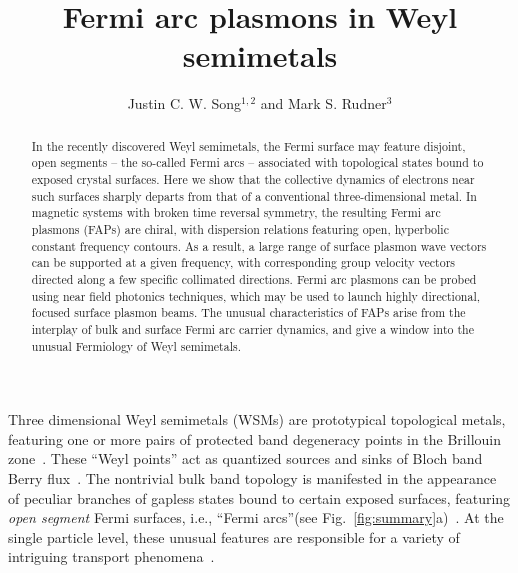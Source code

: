 \documentclass[aps,twocolumn,prl,groupedaddress]{revtex4}
\begin{document}
\title{Fermi arc plasmons in Weyl semimetals}
\author{Justin C. W. Song$^{1,2}$ and Mark S. Rudner$^3$}
\begin{abstract}
In the recently discovered Weyl semimetals, the Fermi surface may feature disjoint, open segments -- the so-called Fermi arcs --  
associated with topological states bound to exposed crystal surfaces. 
Here we show that the collective dynamics of electrons near such surfaces sharply departs from that of a conventional three-dimensional metal. 
In magnetic systems with broken time reversal symmetry, the resulting Fermi arc plasmons (FAPs) are chiral, with dispersion relations featuring open, hyperbolic constant frequency contours. 
As a result, a large range of surface plasmon wave vectors can be supported at a given frequency, with corresponding group velocity vectors directed along a few specific  
collimated directions. Fermi arc plasmons can be probed using near field photonics techniques, which may be used to launch highly directional, focused surface plasmon beams. 
The unusual characteristics of FAPs arise from the interplay of bulk and surface Fermi arc carrier dynamics, and give a window into the unusual Fermiology of Weyl semimetals.
\end{abstract} 

\maketitle

Three dimensional Weyl semimetals (WSMs) are prototypical topological metals, featuring one or more pairs of protected band degeneracy points in the Brillouin zone~\cite{yingran,balents,wan,xugang,ding15,hasan15, TurnerVishwanath}.
These ``Weyl points'' act as quantized sources and sinks of Bloch band Berry flux~\cite{Haldane2004}.
The nontrivial bulk band topology is manifested in the appearance of peculiar branches of gapless states bound to certain exposed surfaces, featuring {\it open segment} Fermi surfaces, i.e., ``Fermi arcs''(see Fig.~\ref{fig:summary}a)~\cite{yingran,balents,wan,xugang,ding15,hasan15, HaldanePlumbing}.
At the single particle level, these unusual features are responsible for a variety of intriguing transport phenomena~\cite{potter,analytis,ong,sonspivak,spivakandreev,xidai, baum,Sid}.
\end{document}
